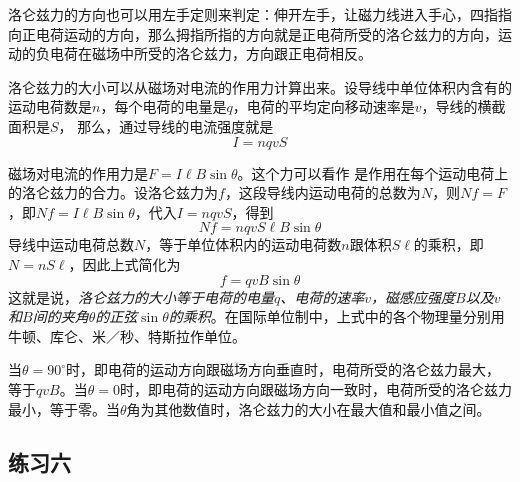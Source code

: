 洛仑兹力的方向也可以用左手定则来判定：伸开左手，让磁力线进入手心，四指指向正电荷运动的方向，那么拇指所指的方向就是正电荷所受的洛仑兹力的方向，运动的负电荷在磁场中所受的洛仑兹力，方向跟正电荷相反。

洛仑兹力的大小可以从磁场对电流的作用力计算出来。设导线中单位体积内含有的运动电荷数是$n$，每个电荷的电量是$q$，电荷的平均定向移动速率是$v$，导线的横截面积是$S$，
那么，通过导线的电流强度就是
\[I=nqvS\]

磁场对电流的作用力是$F=I\ell B\sin\theta$。这个力可以看作
是作用在每个运动电荷上的洛仑兹力的合力。设洛仑兹力为$f$，这段导线内运动电荷的总数为$N$，则$Nf=F$，即$Nf=I\ell B\sin\theta$，代入$I=nqvS$，得到
\[Nf=nqvS\ell B\sin\theta \]
导线中运动电荷总数$N$，等于单位体积内的运动电荷数$n$跟体积$S\ell$的乘积，即$N=nS\ell$，因此上式简化为
\[f=qvB\sin\theta \]
这就是说，\textit{洛仑兹力的大小等于电荷的电量$q$、电荷的速率$v$，磁感应强度$B$以及$v$和$B$间的夹角$\theta$的正弦$\sin\theta$的乘积}。在国际单位制中，上式中的各个物理量分别用牛顿、库仑、米／秒、特斯拉作单位。

当$\theta=90^{\circ}$时，即电荷的运动方向跟磁场方向垂直时，电荷所受的洛仑兹力最大，等于$qvB$。当$\theta=0$时，即电荷的运动方向跟磁场方向一致时，电荷所受的洛仑兹力最小，等于零。当$\theta$角为其他数值时，洛仑兹力的大小在最大值和最小值之间。

\subsection*{练习六}

